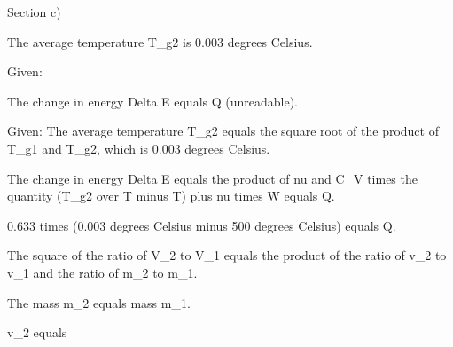 Section c)

The average temperature T_g2 is 0.003 degrees Celsius.

Given:

The change in energy Delta E equals Q (unreadable).

Given: The average temperature T_g2 equals the square root of the product of T_g1 and T_g2, which is 0.003 degrees Celsius.

The change in energy Delta E equals the product of nu and C_V times the quantity (T_g2 over T minus T) plus nu times W equals Q.

0.633 times (0.003 degrees Celsius minus 500 degrees Celsius) equals Q.

The square of the ratio of V_2 to V_1 equals the product of the ratio of v_2 to v_1 and the ratio of m_2 to m_1.

The mass m_2 equals mass m_1.

v_2 equals